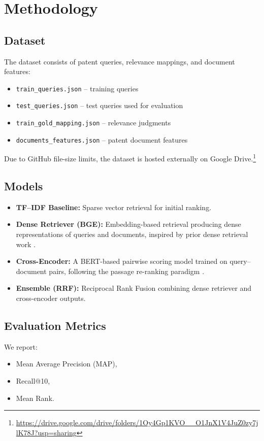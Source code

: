 \documentclass[11pt,a4paper]{article}
\begin{document}
\section{Methodology}
\subsection{Dataset}
The dataset consists of patent queries, relevance mappings, and document features:
\begin{itemize}
    \item \texttt{train\_queries.json} – training queries
    \item \texttt{test\_queries.json} – test queries used for evaluation
    \item \texttt{train\_gold\_mapping.json} – relevance judgments
    \item \texttt{documents\_features.json} – patent document features
\end{itemize}
Due to GitHub file-size limits, the dataset is hosted externally on Google Drive.\footnote{\url{https://drive.google.com/drive/folders/1Oy4Gp1KVO__O1JnX1V4JuZ0zy7jlK78J?usp=sharing}}

\subsection{Models}
\begin{itemize}
    \item \textbf{TF--IDF Baseline:} Sparse vector retrieval for initial ranking.
    \item \textbf{Dense Retriever (BGE):} Embedding-based retrieval producing dense representations of queries and documents, inspired by prior dense retrieval work \cite{karpukhin-etal-2020-dense}.
    \item \textbf{Cross-Encoder:} A BERT-based pairwise scoring model trained on query--document pairs, following the passage re-ranking paradigm \cite{nogueira2019passage}.
    \item \textbf{Ensemble (RRF):} Reciprocal Rank Fusion combining dense retriever and cross-encoder outputs.
\end{itemize}

\subsection{Evaluation Metrics}
We report:
\begin{itemize}
    \item Mean Average Precision (MAP),
    \item Recall@10,
    \item Mean Rank.
\end{itemize}
\end{document}
